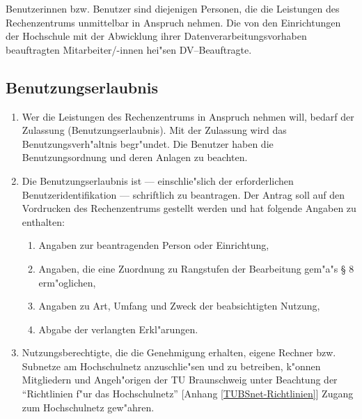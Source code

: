 
Benutzerinnen bzw. Benutzer sind diejenigen Personen, die die Leistungen
des Rechenzentrums unmittelbar in Anspruch nehmen. Die von den
Einrichtungen der Hochschule mit der Abwicklung ihrer
Datenverarbeitungsvorhaben beauftragten Mitarbeiter/-innen hei"sen
DV--Beauftragte.


\subsection{Benutzungserlaubnis}


\begin{enumerate}
  \item Wer die Leistungen des Rechenzentrums in Anspruch nehmen will, bedarf
    der Zulassung (Benutzungserlaubnis). Mit der Zulassung wird das
    Benutzungsverh"altnis begr"undet. Die Benutzer haben die
    Benutzungsordnung und deren Anlagen zu beachten.

  \item Die Benutzungserlaubnis ist --- einschlie"slich der erforderlichen
    Benutzeridentifikation --- schriftlich zu beantragen. Der Antrag soll auf
    den Vordrucken des Rechenzentrums gestellt werden und hat folgende
    Angaben zu enthalten:

    \begin{enumerate}
      \item Angaben zur beantragenden Person oder Einrichtung,
      \item Angaben, die eine Zuordnung zu Rangstufen der Bearbeitung
        gem"a"s \S{} 8 erm"oglichen,
      \item Angaben zu Art, Umfang und Zweck der beabsichtigten Nutzung,
      \item Abgabe der verlangten Erkl"arungen.
    \end{enumerate}

  \item Nutzungsberechtigte, die die Genehmigung erhalten, eigene Rechner
    bzw. Subnetze am Hochschulnetz anzuschlie"sen und zu betreiben,
    k"onnen Mitgliedern und Angeh"origen der TU Braunschweig unter
    Beachtung der "`Richtlinien f"ur das Hochschulnetz"' [Anhang
    \ref{TUBSnet-Richtlinien}] Zugang zum Hochschulnetz gew"ahren.
\end{enumerate}


